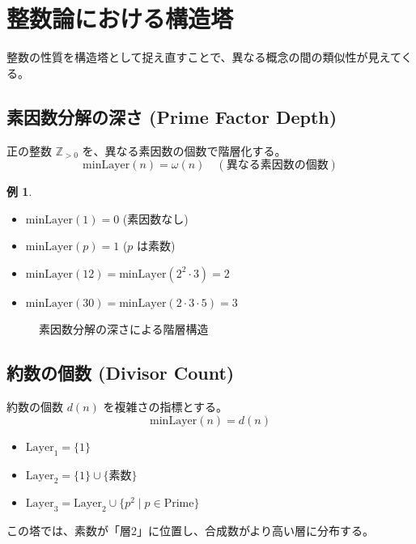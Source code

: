 \documentclass[a4paper,11pt]{ltjsarticle}
\theoremstyle{definition}
\newtheorem{example}[definition]{例}
\newcommand{\Z}{\mathbb{Z}}
\newcommand{\Layer}[1]{\mathrm{Layer}_{#1}}
\newcommand{\MinLayer}{\mathrm{minLayer}}
\begin{document}
\section{整数論における構造塔}

整数の性質を構造塔として捉え直すことで、異なる概念の間の類似性が見えてくる。

\subsection{素因数分解の深さ (Prime Factor Depth)}
正の整数 $\Z_{>0}$ を、異なる素因数の個数で階層化する。
\[ \MinLayer(n) = \omega(n) \quad (\text{異なる素因数の個数}) \]

\begin{example}
\begin{itemize}
    \item $\MinLayer(1) = 0$ (素因数なし)
    \item $\MinLayer(p) = 1$ ($p$ は素数)
    \item $\MinLayer(12) = \MinLayer(2^2 \cdot 3) = 2$
    \item $\MinLayer(30) = \MinLayer(2 \cdot 3 \cdot 5) = 3$
\end{itemize}
\end{example}

\begin{figure}[h]
\centering
{}
\caption{素因数分解の深さによる階層構造}
\end{figure}

\subsection{約数の個数 (Divisor Count)}
約数の個数 $d(n)$ を複雑さの指標とする。
\[ \MinLayer(n) = d(n) \]
\begin{itemize}
    \item $\Layer{1} = \{1\}$
    \item $\Layer{2} = \{1\} \cup \{ \text{素数} \}$
    \item $\Layer{3} = \Layer{2} \cup \{ p^2 \mid p \in \text{Prime} \}$
\end{itemize}
この塔では、素数が「層2」に位置し、合成数がより高い層に分布する。
\end{document}
